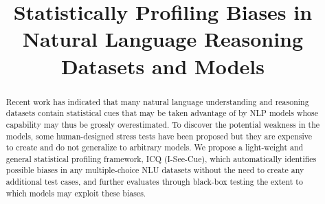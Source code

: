 \documentclass[runningheads]{llncs}
\begin{document}
%
\title{Statistically Profiling Biases in Natural Language Reasoning Datasets and Models}
%
%
%
%

\maketitle
\begin{abstract}
Recent work has indicated that many natural language understanding and 
reasoning datasets contain statistical cues that
may be taken advantage of by NLP models whose
capability may thus be grossly overestimated. 
To discover the potential weakness in the models, some human-designed 
stress tests have been proposed but they are expensive to create 
and do not generalize to arbitrary models. 
We propose a light-weight and general statistical profiling framework, 
ICQ (I-See-Cue), which automatically identifies possible biases
in any multiple-choice NLU datasets without 
the need to create any additional test cases, and further evaluates
through black-box testing the extent to which models may exploit these biases. 
\end{abstract}










\end{document}
